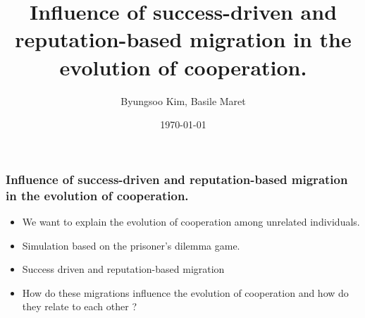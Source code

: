 \documentclass{beamer}
\title[MSSSM]{Influence of success-driven and reputation-based migration in the evolution of cooperation.}
\author{Byungsoo Kim, Basile Maret} %
\date{\today} %
\begin{document}
\begin{frame}
\frametitle{Influence of success-driven and reputation-based migration in the evolution of cooperation.}
\begin{itemize}
\item We want to explain the evolution of cooperation among unrelated individuals.
\item Simulation based on the prisoner's dilemma game.
\item Success driven and reputation-based migration
\item How do these migrations influence the evolution of cooperation and how do they relate to each other ?

\end{itemize}
\end{frame}
\end{document}
